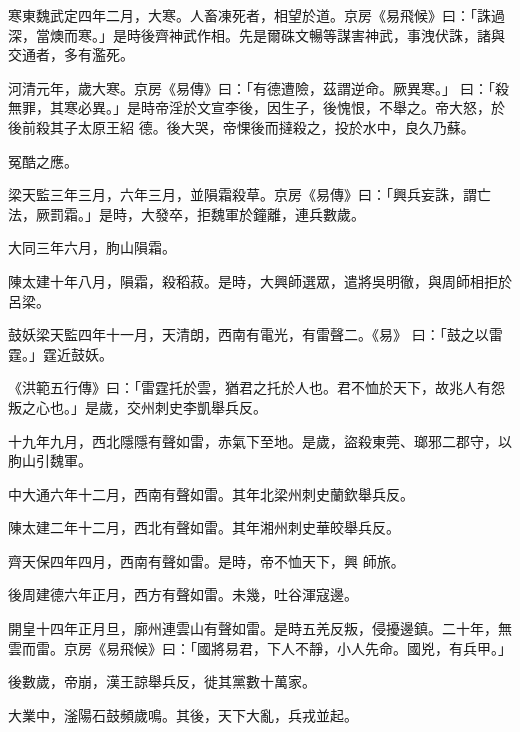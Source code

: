 \begin{pinyinscope}
 寒東魏武定四年二月，大寒。人畜凍死者，相望於道。京房《易飛候》曰：「誅過深，當燠而寒。」是時後齊神武作相。先是爾硃文暢等謀害神武，事洩伏誅，諸與交通者，多有濫死。



 河清元年，歲大寒。京房《易傳》曰：「有德遭險，茲謂逆命。厥異寒。」曰：「殺無罪，其寒必異。」是時帝淫於文宣李後，因生子，後愧恨，不舉之。帝大怒，於後前殺其子太原王紹
 德。後大哭，帝惈後而撻殺之，投於水中，良久乃蘇。



 冤酷之應。



 梁天監三年三月，六年三月，並隕霜殺草。京房《易傳》曰：「興兵妄誅，謂亡法，厥罰霜。」是時，大發卒，拒魏軍於鐘離，連兵數歲。



 大同三年六月，朐山隕霜。



 陳太建十年八月，隕霜，殺稻菽。是時，大興師選眾，遣將吳明徹，與周師相拒於呂梁。



 鼓妖梁天監四年十一月，天清朗，西南有電光，有雷聲二。《易》
 曰：「鼓之以雷霆。」霆近鼓妖。



 《洪範五行傳》曰：「雷霆托於雲，猶君之托於人也。君不恤於天下，故兆人有怨叛之心也。」是歲，交州刺史李凱舉兵反。



 十九年九月，西北隱隱有聲如雷，赤氣下至地。是歲，盜殺東莞、瑯邪二郡守，以朐山引魏軍。



 中大通六年十二月，西南有聲如雷。其年北梁州刺史蘭欽舉兵反。



 陳太建二年十二月，西北有聲如雷。其年湘州刺史華皎舉兵反。



 齊天保四年四月，西南有聲如雷。是時，帝不恤天下，興
 師旅。



 後周建德六年正月，西方有聲如雷。未幾，吐谷渾寇邊。



 開皇十四年正月旦，廓州連雲山有聲如雷。是時五羌反叛，侵擾邊鎮。二十年，無雲而雷。京房《易飛候》曰：「國將易君，下人不靜，小人先命。國兇，有兵甲。」



 後數歲，帝崩，漢王諒舉兵反，徙其黨數十萬家。



 大業中，滏陽石鼓頻歲鳴。其後，天下大亂，兵戎並起。




\end{pinyinscope}
